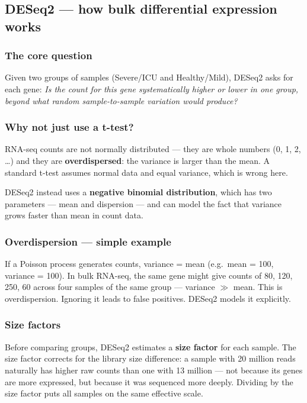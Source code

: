 \documentclass[11pt, a4paper]{article}
\begin{document}
\subsection{DESeq2 — how bulk differential expression works}

\subsubsection*{The core question}

Given two groups of samples (Severe/ICU and Healthy/Mild), DESeq2 asks for each gene:
\textit{Is the count for this gene systematically higher or lower in one group,
beyond what random sample-to-sample variation would produce?}

\subsubsection*{Why not just use a t-test?}

RNA-seq counts are not normally distributed — they are whole numbers (0, 1, 2, \ldots)
and they are \textbf{overdispersed}: the variance is larger than the mean.
A standard t-test assumes normal data and equal variance, which is wrong here.

DESeq2 instead uses a \textbf{negative binomial distribution}, which has two
parameters — mean and dispersion — and can model the fact that variance grows
faster than mean in count data.

\subsubsection*{Overdispersion — simple example}

If a Poisson process generates counts, variance = mean (e.g.\ mean = 100, variance = 100).
In bulk RNA-seq, the same gene might give counts of 80, 120, 250, 60 across four samples
of the same group — variance $\gg$ mean. This is overdispersion.
Ignoring it leads to false positives. DESeq2 models it explicitly.

\subsubsection*{Size factors}

Before comparing groups, DESeq2 estimates a \textbf{size factor} for each sample.
The size factor corrects for the library size difference: a sample with 20 million reads
naturally has higher raw counts than one with 13 million — not because its genes are
more expressed, but because it was sequenced more deeply.
Dividing by the size factor puts all samples on the same effective scale.
\end{document}
